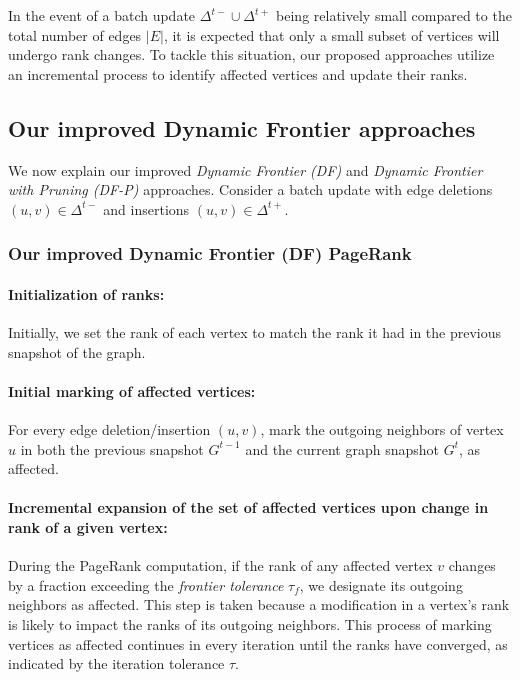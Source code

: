 In the event of a batch update $\Delta^{t-} \cup \Delta^{t+}$ being relatively small compared to the total number of edges $|E|$, it is expected that only a small subset of vertices will undergo rank changes. To tackle this situation, our proposed approaches utilize an incremental process to identify affected vertices and update their ranks.




\subsection{Our improved Dynamic Frontier approaches}
\label{sec:frontier}

We now explain our improved \textit{Dynamic Frontier (DF)} and \textit{Dynamic Frontier with Pruning (DF-P)} approaches. Consider a batch update with edge deletions $(u, v) \in \Delta^{t-}$ and insertions $(u, v) \in \Delta^{t+}$.


\subsubsection{Our improved Dynamic Frontier (DF) PageRank}

\paragraph{Initialization of ranks:}

Initially, we set the rank of each vertex to match the rank it had in the previous snapshot of the graph.

\paragraph{Initial marking of affected vertices:}

For every edge deletion/insertion $(u, v)$, mark the outgoing neighbors of vertex $u$ in both the previous snapshot $G^{t-1}$ and the current graph snapshot $G^t$, as affected.

\paragraph{Incremental expansion of the set of affected vertices upon change in rank of a given vertex:}

During the PageRank computation, if the rank of any affected vertex $v$ changes by a fraction exceeding the \textit{frontier tolerance} $\tau_f$, we designate its outgoing neighbors as affected. This step is taken because a modification in a vertex's rank is likely to impact the ranks of its outgoing neighbors. This process of marking vertices as affected continues in every iteration until the ranks have converged, as indicated by the iteration tolerance $\tau$.


